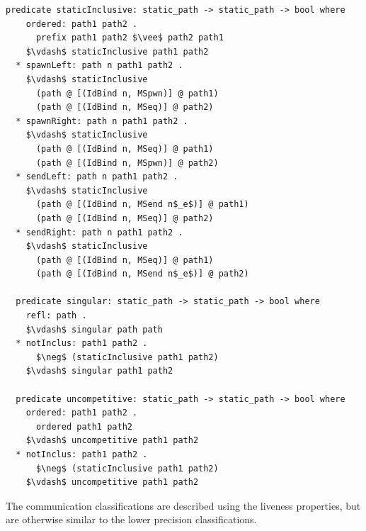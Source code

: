 \documentclass[letterpaper, 11pt]{report}
\begin{document}
\begin{lstlisting}[language=logic, mathescape]
  predicate staticInclusive: static_path -> static_path -> bool where
    ordered: path1 path2 .
      prefix path1 path2 $\vee$ path2 path1
    $\vdash$ staticInclusive path1 path2
  * spawnLeft: path n path1 path2 .
    $\vdash$ staticInclusive
      (path @ [(IdBind n, MSpwn)] @ path1)
      (path @ [(IdBind n, MSeq)] @ path2)
  * spawnRight: path n path1 path2 .
    $\vdash$ staticInclusive
      (path @ [(IdBind n, MSeq)] @ path1)
      (path @ [(IdBind n, MSpwn)] @ path2)
  * sendLeft: path n path1 path2 .
    $\vdash$ staticInclusive
      (path @ [(IdBind n, MSend n$_e$)] @ path1)
      (path @ [(IdBind n, MSeq)] @ path2)
  * sendRight: path n path1 path2 .
    $\vdash$ staticInclusive
      (path @ [(IdBind n, MSeq)] @ path1)
      (path @ [(IdBind n, MSend n$_e$)] @ path2)

  predicate singular: static_path -> static_path -> bool where
    refl: path .
    $\vdash$ singular path path
  * notInclus: path1 path2 .
      $\neg$ (staticInclusive path1 path2)
    $\vdash$ singular path1 path2

  predicate uncompetitive: static_path -> static_path -> bool where
    ordered: path1 path2 . 
      ordered path1 path2
    $\vdash$ uncompetitive path1 path2
  * notInclus: path1 path2 .
      $\neg$ (staticInclusive path1 path2)
    $\vdash$ uncompetitive path1 path2
  \end{lstlisting}

The communication classifications are described using the liveness properties, but
are otherwise similar to the lower precision classifications.
\end{document}
